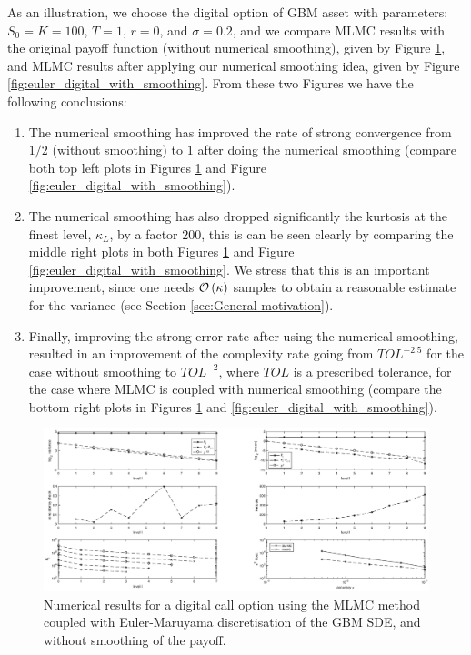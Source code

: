 As an illustration, we choose the digital option of GBM asset with parameters: $S_0=K=100$, $T=1$, $r= 0$, and   $\sigma=0.2$, and we compare MLMC results with the original payoff function (without numerical smoothing), given by Figure \ref{fig:euler_digital_without_smoothing},  and MLMC results after applying our numerical smoothing idea, given by Figure \ref{fig:euler_digital_with_smoothing}. From these two Figures we have the following conclusions:
\begin{enumerate}
\item The numerical smoothing has improved the rate of strong convergence from $1/2$ (without smoothing) to $1$ after doing the numerical smoothing (compare both top left plots in Figures \ref{fig:euler_digital_without_smoothing} and Figure \ref{fig:euler_digital_with_smoothing}).
\item The numerical smoothing has also dropped significantly the kurtosis at the finest level, $\kappa_L$, by a factor $200$, this is can be seen clearly by comparing the middle right plots in both Figures \ref{fig:euler_digital_without_smoothing} and Figure \ref{fig:euler_digital_with_smoothing}. We stress that this is an important improvement, since one needs ${\mathcal{O}}\left(\kappa\right)$ samples  to obtain a reasonable estimate for the variance (see Section \ref{sec:General motivation}).  
\item Finally, improving the strong error rate after using the numerical smoothing, resulted in an improvement of the complexity rate going from $TOL^{-2.5}$ for the case without smoothing to  $TOL^{-2}$, where $TOL$ is a prescribed tolerance, for the case where MLMC is coupled with numerical smoothing (compare the bottom right plots in Figures \ref{fig:euler_digital_without_smoothing} and \ref{fig:euler_digital_with_smoothing}).
\end{enumerate}
\FloatBarrier
	\begin{figure}[h!]
\centering
\includegraphics[width=1.2\linewidth]{./figures/MLMC_binary_GBM_opt/euler_digital_without_smoothing_L0_2step}

\caption{Numerical results for a digital call option using the MLMC method coupled with Euler-Maruyama discretisation of the GBM SDE, and without smoothing of the payoff.}
\label{fig:euler_digital_without_smoothing}
\end{figure}

